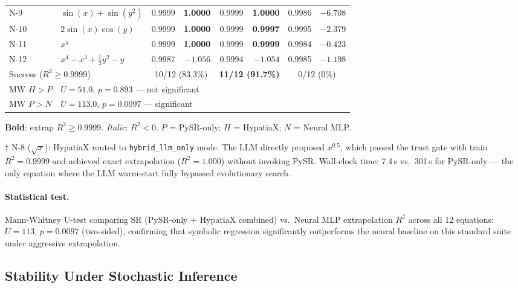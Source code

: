 \documentclass[twoside,11pt]{article}
\newcommand{\Rsq}{R^{2}}
\begin{document}
\begin{table}[h]
\begin{threeparttable}
\begin{tabular}{llrrrrrr}
N-9  & $\sin(x)+\sin(y^2)$
  & 0.9999 & \textbf{1.0000}
  & 0.9999 & \textbf{1.0000}
  & 0.9986 & $-6.708$ \\
N-10 & $2\sin(x)\cos(y)$
  & 0.9999 & \textbf{1.0000}
  & 0.9999 & \textbf{0.9997}
  & 0.9995 & $-2.379$ \\
N-11 & $x^y$
  & 0.9999 & \textbf{1.0000}
  & 0.9999 & \textbf{0.9999}
  & 0.9984 & $-0.423$ \\
N-12 & $x^4 - x^3 + \tfrac{1}{2}y^2 - y$
  & 0.9987 & $-1.056$
  & 0.9994 & $-1.054$
  & 0.9985 & $-1.198$ \\
\midrule
\multicolumn{2}{l}{Success ($\Rsq\ge0.9999$)}
  & \multicolumn{2}{c}{10/12 (83.3\%)}
  & \multicolumn{2}{c}{\textbf{11/12 (91.7\%)}}
  & \multicolumn{2}{c}{0/12 (0\%)} \\
MW $H>P$   & \multicolumn{7}{l}{$U=51.0$, $p=0.893$ — not significant} \\
MW $P>N$   & \multicolumn{7}{l}{$U=113.0$, $p=0.0097$ — significant} \\
\bottomrule
\end{tabular}
\begin{tablenotes}\small
  \item \textbf{Bold}: extrap $\Rsq \ge 0.9999$. \emph{Italic}: $\Rsq < 0$.
    $P$ = PySR-only; $H$ = HypatiaX; $N$ = Neural MLP.
  \item[$\dag$] N-8 ($\sqrt{x}$): HypatiaX routed to \texttt{hybrid\_llm\_only} mode.
    The LLM directly proposed $x^{0.5}$, which passed the trust gate with
    train $\Rsq = 0.9999$ and achieved exact extrapolation ($\Rsq = 1.000$)
    without invoking PySR. Wall-clock time: 7.4\,s vs.\ 301\,s for PySR-only ---
    the only equation where the LLM warm-start fully bypassed evolutionary search.
\end{tablenotes}
\end{threeparttable}
\end{table}

\paragraph{Statistical test.}
Mann-Whitney U-test comparing SR (PySR-only + HypatiaX combined) vs.\ Neural MLP
extrapolation $\Rsq$ across all 12 equations: $U=113$, $p=0.0097$ (two-sided),
confirming that symbolic regression significantly outperforms the neural baseline
on this standard suite under aggressive extrapolation.

\subsection{Stability Under Stochastic Inference}\label{subsec:stability-under-stochastic-inference}
\label{sec:instability_results}
\end{document}
